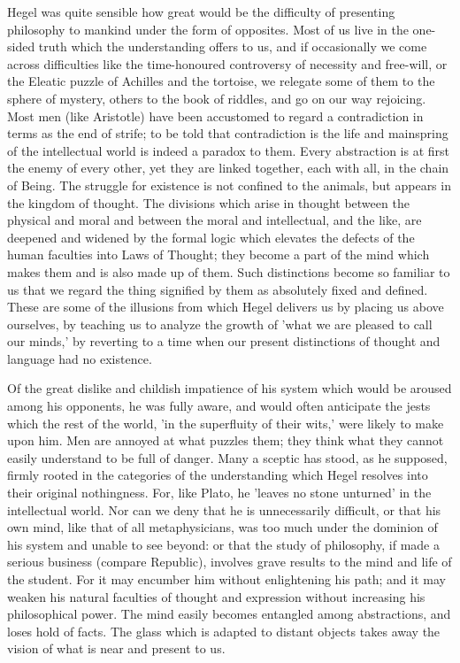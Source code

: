 \documentclass[11pt,letter]{article}
\begin{document}
\par  Hegel was quite sensible how great would be the difficulty of presenting philosophy to mankind under the form of opposites. Most of us live in the one-sided truth which the understanding offers to us, and if occasionally we come across difficulties like the time-honoured controversy of necessity and free-will, or the Eleatic puzzle of Achilles and the tortoise, we relegate some of them to the sphere of mystery, others to the book of riddles, and go on our way rejoicing. Most men (like Aristotle) have been accustomed to regard a contradiction in terms as the end of strife; to be told that contradiction is the life and mainspring of the intellectual world is indeed a paradox to them. Every abstraction is at first the enemy of every other, yet they are linked together, each with all, in the chain of Being. The struggle for existence is not confined to the animals, but appears in the kingdom of thought. The divisions which arise in thought between the physical and moral and between the moral and intellectual, and the like, are deepened and widened by the formal logic which elevates the defects of the human faculties into Laws of Thought; they become a part of the mind which makes them and is also made up of them. Such distinctions become so familiar to us that we regard the thing signified by them as absolutely fixed and defined. These are some of the illusions from which Hegel delivers us by placing us above ourselves, by teaching us to analyze the growth of 'what we are pleased to call our minds,' by reverting to a time when our present distinctions of thought and language had no existence.

\par  Of the great dislike and childish impatience of his system which would be aroused among his opponents, he was fully aware, and would often anticipate the jests which the rest of the world, 'in the superfluity of their wits,' were likely to make upon him. Men are annoyed at what puzzles them; they think what they cannot easily understand to be full of danger. Many a sceptic has stood, as he supposed, firmly rooted in the categories of the understanding which Hegel resolves into their original nothingness. For, like Plato, he 'leaves no stone unturned' in the intellectual world. Nor can we deny that he is unnecessarily difficult, or that his own mind, like that of all metaphysicians, was too much under the dominion of his system and unable to see beyond: or that the study of philosophy, if made a serious business (compare Republic), involves grave results to the mind and life of the student. For it may encumber him without enlightening his path; and it may weaken his natural faculties of thought and expression without increasing his philosophical power. The mind easily becomes entangled among abstractions, and loses hold of facts. The glass which is adapted to distant objects takes away the vision of what is near and present to us.
\end{document}
